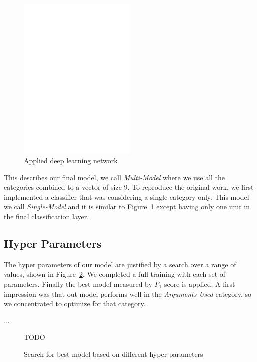\documentclass[11pt,a4paper]{article}
\begin{document}
\begin{figure}[h!]
	\centering
	\includegraphics[trim={1cm 19.5cm 5cm 3cm},clip,page=2, width=0.5\textwidth]{img/model}
	\caption{Applied deep learning network}
	\label{fig:model}
\end{figure}

This describes our final model, we call \textit{Multi-Model} where we use all the categories combined to a vector of size 9.
To reproduce the original work, we first implemented a classifier that was considering a single category only. 
This model we call \textit{Single-Model} and it is similar to Figure~\ref{fig:model} except having only one unit in the final classification layer.


\subsection{Hyper Parameters}

The hyper parameters of our model are justified by a search over a range of values, shown in Figure~\ref{fig:hyper_params}. We completed a full training with each set of parameters. Finally the best model measured by $F_1$ score is applied. A first impression was that out model performs well in the \textit{Arguments Used} category, so we concentrated to optimize for that category.

...
\begin{figure}[h!]
	\centering
	TODO
	\caption{Search for best model based on different hyper parameters}
	\label{fig:hyper_params}
\end{figure}
\end{document}
